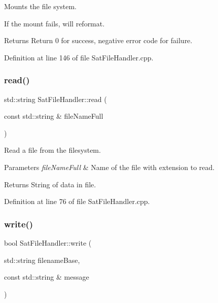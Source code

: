 Mounts the file system. 

If the mount fails, will reformat. \begin{DoxyReturn}{Returns}
Return 0 for success, negative error code for failure. 
\end{DoxyReturn}


Definition at line 146 of file Sat\+File\+Handler.\+cpp.

\mbox{\label{class_sat_file_handler_a5529b9e3f7ec6ae60db4c9c83fbe6ea8}} 
\subsubsection{\texorpdfstring{read()}{read()}}
{\footnotesize\ttfamily std\+::string Sat\+File\+Handler\+::read (\begin{DoxyParamCaption}\item[{const std\+::string \&}]{file\+Name\+Full }\end{DoxyParamCaption})}



Read a file from the filesystem. 


\begin{DoxyParams}{Parameters}
{\em file\+Name\+Full} & Name of the file with extension to read. \\
\hline
\end{DoxyParams}
\begin{DoxyReturn}{Returns}
String of data in file. 
\end{DoxyReturn}


Definition at line 76 of file Sat\+File\+Handler.\+cpp.

\mbox{\label{class_sat_file_handler_a54f30111dd898bc6ce1e0c0ce6a82350}} 
\subsubsection{\texorpdfstring{write()}{write()}}
{\footnotesize\ttfamily bool Sat\+File\+Handler\+::write (\begin{DoxyParamCaption}\item[{std\+::string}]{filename\+Base,  }\item[{const std\+::string \&}]{message }\end{DoxyParamCaption})}



